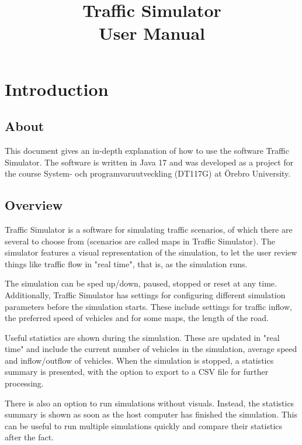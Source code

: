 \documentclass[titlepage]{article}
\title{
    \textbf{Traffic Simulator} \\ [0.4 em]
    \large User Manual
}
\begin{document}
\maketitle

\pagebreak

\tableofcontents

\pagebreak
{} 

\section{Introduction}

\subsection{About}

This document gives an in-depth explanation of how to use the software
Traffic Simulator.
The software is written in Java 17 and was developed as a project for the
course System- och programvaruutveckling (DT117G) at Örebro University.

\subsection{Overview}

Traffic Simulator is a software for simulating traffic scenarios,
of which there are several to choose from (scenarios are called maps in
Traffic Simulator). The simulator features a visual representation of
the simulation, to let the user review things like traffic flow in
"real time", that is, as the simulation runs.

The simulation can be sped up/down, paused, stopped or
reset at any time.
Additionally, Traffic Simulator has settings for configuring different
simulation parameters before the simulation starts. These include settings
for traffic inflow, the preferred speed of vehicles and for some maps, the
length of the road.

Useful statistics are shown during the simulation. These are updated in
"real time" and include the current number of vehicles in the simulation,
average speed and inflow/outflow of vehicles.
When the simulation is stopped, a statistics summary is presented, with
the option to export to a CSV file for further processing.

There is also an option to run simulations without visuals. Instead, 
the statistics summary is shown as soon as the host computer has finished
the simulation. This can be useful to run multiple simulations quickly
and compare their statistics after the fact.
\end{document}
